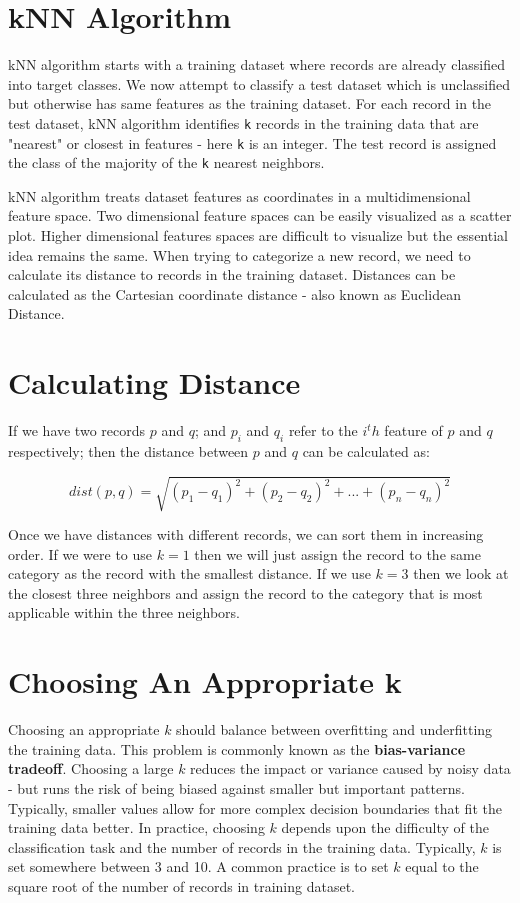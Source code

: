 \documentclass[11pt, letterpaper, twoside]{memoir}\usepackage{knitr}
\begin{document}
\section{kNN Algorithm}

kNN algorithm starts with a training dataset where records are already classified into target classes. We now attempt to classify a test dataset which is unclassified but otherwise has same features as the training dataset. For each record in the test dataset, kNN algorithm identifies \verb|k| records in the training data that are "nearest" or closest in features - here \verb|k| is an integer. The test record is assigned the class of the majority of the \verb|k| nearest neighbors.

kNN algorithm treats dataset features as coordinates in a multidimensional feature space. Two dimensional feature spaces can be easily visualized as a scatter plot. Higher dimensional features spaces are difficult to visualize but the essential idea remains the same. When trying to categorize a new record, we need to calculate its distance to records in the training dataset. Distances can be calculated as the Cartesian coordinate distance - also known as Euclidean Distance.

\section{Calculating Distance}

If we have two records $p$ and $q$; and $p_i$ and $q_i$ refer to the $i^th$ feature of $p$ and $q$ respectively; then the distance between $p$ and $q$ can be calculated as:

\[ dist(p, q) = \sqrt{(p_1 - q_1)^2 + (p_2 - q_2)^2 + ... + (p_n - q_n)^2} \]

Once we have distances with different records, we can sort them in increasing order. If we were to use $k = 1$ then we will just assign the record to the same category as the record with the smallest distance. If we use $k = 3$ then we look at the closest three neighbors and assign the record to the category that is most applicable within the three neighbors. 

\section{Choosing An Appropriate k}

Choosing an appropriate $k$ should balance between overfitting and underfitting the training data. This problem is commonly known as the \textbf{bias-variance tradeoff}. Choosing a large $k$ reduces the impact or variance caused by noisy data - but runs the risk of being biased against smaller but important patterns. Typically, smaller values allow for more complex decision boundaries that fit the training data better. In practice, choosing $k$ depends upon the difficulty of the classification task and the number of records in the training data. Typically, $k$ is set somewhere between 3 and 10. A common practice is to set $k$ equal to the square root of the number of records in training dataset.
\end{document}
